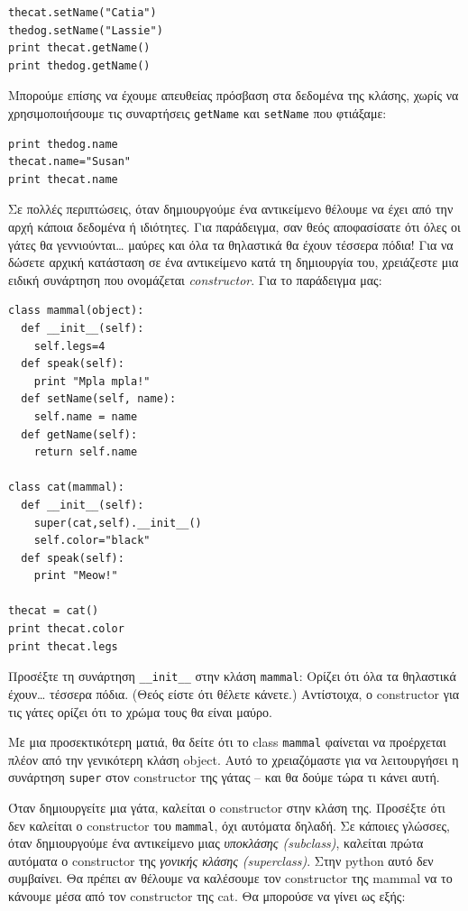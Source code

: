 \begin{verbatim}
thecat.setName("Catia")
thedog.setName("Lassie")
print thecat.getName()
print thedog.getName()
\end{verbatim}

Μπορούμε επίσης να έχουμε απευθείας πρόσβαση στα δεδομένα της κλάσης,
χωρίς να χρησιμοποιήσουμε τις συναρτήσεις {\tt getName} και {\tt setName} που
φτιάξαμε:

\begin{verbatim}
print thedog.name
thecat.name="Susan"
print thecat.name
\end{verbatim}

Σε πολλές περιπτώσεις, όταν δημιουργούμε ένα αντικείμενο θέλουμε να έχει
από την αρχή κάποια δεδομένα ή ιδιότητες. Για παράδειγμα, σαν θεός
αποφασίσατε ότι όλες οι γάτες θα γεννιούνται\ldots{} μαύρες και όλα τα θηλαστικά
θα έχουν τέσσερα πόδια! Για να δώσετε αρχική κατάσταση σε ένα αντικείμενο
κατά τη δημιουργία του, χρειάζεστε μια ειδική συνάρτηση που ονομάζεται
{\em constructor}. Για το παράδειγμα μας:

\begin{verbatim}
class mammal(object):
  def __init__(self):
    self.legs=4
  def speak(self):
    print "Mpla mpla!"
  def setName(self, name):
    self.name = name
  def getName(self):
    return self.name

class cat(mammal):
  def __init__(self):
    super(cat,self).__init__()
    self.color="black"
  def speak(self):
    print "Meow!"

thecat = cat()
print thecat.color
print thecat.legs
\end{verbatim}

Προσέξτε τη συνάρτηση {\tt \_\_init\_\_} στην κλάση {\tt mammal}: Ορίζει ότι όλα τα
θηλαστικά έχουν\ldots{} τέσσερα πόδια. (Θεός είστε ότι θέλετε κάνετε.)
Αντίστοιχα, ο constructor για τις γάτες ορίζει ότι το χρώμα τους θα είναι
μαύρο.

Με μια προσεκτικότερη ματιά, θα δείτε ότι το class {\tt mammal} φαίνεται να
προέρχεται πλέον από την γενικότερη κλάση object. Αυτό το χρειαζόμαστε για να λειτουργήσει η συνάρτηση {\tt super} στον constructor της γάτας -- και θα
δούμε τώρα τι κάνει αυτή.

Όταν δημιουργείτε μια γάτα, καλείται ο constructor στην κλάση της. Προσέξτε
ότι δεν καλείται ο constructor του {\tt mammal}, όχι αυτόματα δηλαδή. Σε κάποιες
γλώσσες, όταν δημιουργούμε ένα αντικείμενο μιας {\em υποκλάσης (subclass)},
καλείται πρώτα αυτόματα ο constructor της {\em γονικής κλάσης (superclass)}.
Στην python αυτό δεν συμβαίνει. Θα πρέπει αν θέλουμε να καλέσουμε τον
constructor της mammal να το κάνουμε μέσα από τον constructor της cat.
Θα μπορούσε να γίνει ως εξής:

